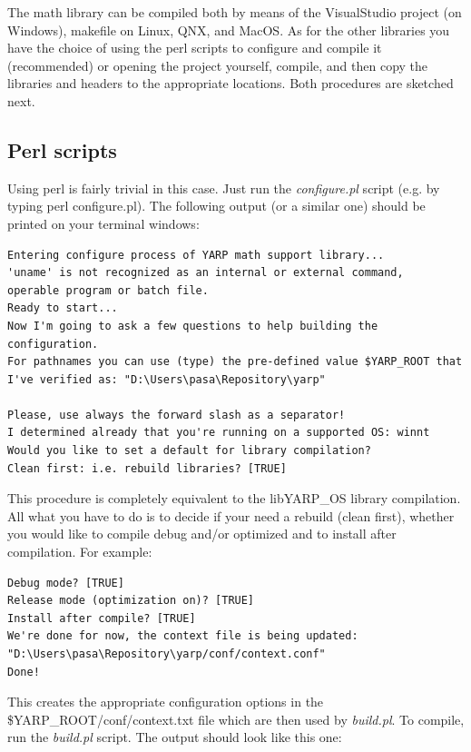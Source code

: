The math library can be compiled both by means of the VisualStudio project (on Windows), makefile on Linux, QNX, and MacOS. As for the other libraries you have the choice of using the perl scripts to configure and compile it (recommended) or opening the project yourself, compile, and then copy the libraries and headers to the appropriate locations. Both procedures are sketched next.

\subsection{Perl scripts}
Using perl is fairly trivial in this case. Just run the {\em configure.pl} script (e.g. by typing perl configure.pl). The following output (or a similar one) should be printed on your terminal windows:

\begin{verbatim}
Entering configure process of YARP math support library...
'uname' is not recognized as an internal or external command,
operable program or batch file.
Ready to start...
Now I'm going to ask a few questions to help building the configuration. 
For pathnames you can use (type) the pre-defined value $YARP_ROOT that 
I've verified as: "D:\Users\pasa\Repository\yarp"

Please, use always the forward slash as a separator!
I determined already that you're running on a supported OS: winnt
Would you like to set a default for library compilation?
Clean first: i.e. rebuild libraries? [TRUE]
\end{verbatim}

This procedure is completely equivalent to the libYARP\_OS library compilation. All what you have to do is to decide if your need a rebuild (clean first), whether you would like to compile debug and/or optimized and to install after compilation. For example:

\begin{verbatim}
Debug mode? [TRUE]
Release mode (optimization on)? [TRUE]
Install after compile? [TRUE]
We're done for now, the context file is being updated: 
"D:\Users\pasa\Repository\yarp/conf/context.conf"
Done!
\end{verbatim}

This creates the appropriate configuration options in the \$YARP\_ROOT/conf/context.txt file which are then used by {\em build.pl}. To compile, run the {\em build.pl} script. The output should look like this one:

